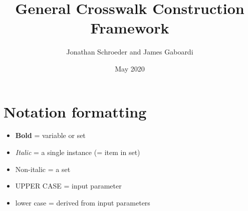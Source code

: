 \documentclass{article}
\title{General Crosswalk Construction Framework}
\author{Jonathan Schroeder and James Gaboardi}
\date{May 2020}
\begin{document}
\maketitle

\section{Notation formatting}
\begin{itemize}
  \item {\bf Bold} = variable or set
  \item \textit{Italic} = a single instance (= item in set)
  \item Non-italic = a set
  \item UPPER CASE = input parameter
  \item lower case = derived from input parameters
\end{itemize}
\end{document}
